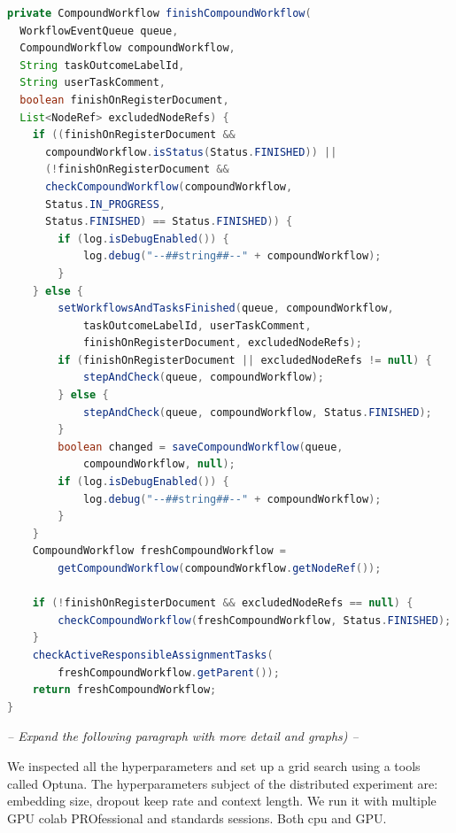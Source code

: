 \begin{lstlisting}[caption={Code snippet with 199 tokens}, label={lst:snippet199},language=Java]
private CompoundWorkflow finishCompoundWorkflow(
  WorkflowEventQueue queue,
  CompoundWorkflow compoundWorkflow, 
  String taskOutcomeLabelId, 
  String userTaskComment, 
  boolean finishOnRegisterDocument, 
  List<NodeRef> excludedNodeRefs) {
    if ((finishOnRegisterDocument &&
      compoundWorkflow.isStatus(Status.FINISHED)) ||
      (!finishOnRegisterDocument &&
      checkCompoundWorkflow(compoundWorkflow,
      Status.IN_PROGRESS, 
      Status.FINISHED) == Status.FINISHED)) {
        if (log.isDebugEnabled()) {
            log.debug("--##string##--" + compoundWorkflow);
        }
    } else {
        setWorkflowsAndTasksFinished(queue, compoundWorkflow, 
            taskOutcomeLabelId, userTaskComment,
            finishOnRegisterDocument, excludedNodeRefs);
        if (finishOnRegisterDocument || excludedNodeRefs != null) {
            stepAndCheck(queue, compoundWorkflow);
        } else {
            stepAndCheck(queue, compoundWorkflow, Status.FINISHED);
        }
        boolean changed = saveCompoundWorkflow(queue,
            compoundWorkflow, null);
        if (log.isDebugEnabled()) {
            log.debug("--##string##--" + compoundWorkflow);
        }
    }
    CompoundWorkflow freshCompoundWorkflow =
        getCompoundWorkflow(compoundWorkflow.getNodeRef());
        
    if (!finishOnRegisterDocument && excludedNodeRefs == null) {
        checkCompoundWorkflow(freshCompoundWorkflow, Status.FINISHED);
    }
    checkActiveResponsibleAssignmentTasks(
        freshCompoundWorkflow.getParent());
    return freshCompoundWorkflow;
}
\end{lstlisting}

\noindent \emph{-- Expand the following paragraph with more detail and graphs) --}

We inspected all the hyperparameters and set up a grid search using a tools called Optuna.
The hyperparameters subject of the distributed experiment are: embedding size, dropout keep rate and context length.
We run it with multiple GPU colab PROfessional and standards sessions. Both cpu and GPU. 

